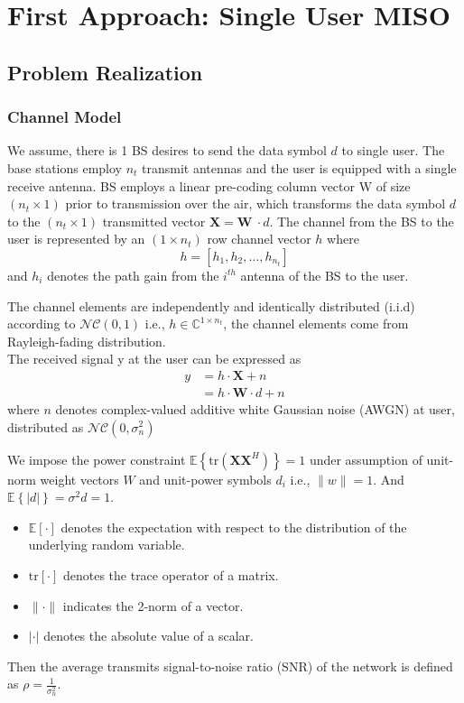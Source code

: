 \chapter{First Approach: Single User MISO}

\section{Problem Realization}

\subsection{Channel Model}
We assume, there is 1 BS desires to send the data symbol $d$ to single user. The base stations employ $n_t$ transmit antennas and the user is equipped with a single receive antenna. BS employs a linear pre-coding column vector W of size $(n_t \times 1)$ prior to transmission over the air, which transforms the data symbol $d$ to the $(n_t \times 1)$ transmitted vector $\mathbf{X}=\mathbf{W}\ \cdot d$.
The channel from the BS to the user is represented by an $(1 \times n_t)$ row channel vector $h$ where \[ h = [h_1, h_2, \ldots, h_{n_t}] \] and $h_i$ denotes the path gain from the $i^{th}$ antenna of the BS to the user.

The channel elements are independently and identically distributed (i.i.d) according to $\mathcal{N}\mathcal{C}(0,1)$ i.e.,
$h \in {\mathbb{C}}^{1 \times n_t}$, the channel elements come from Rayleigh-fading distribution. \\
The received signal y at the user can be expressed as
\begin{equation}
    \label{eq:channel model}
    \begin{aligned}
        y &= h \cdot \mathbf{X} + n \\
        &= h \cdot \mathbf{W} \cdot d + n
    \end{aligned}
\end{equation}
where $n$ denotes complex-valued additive white Gaussian noise (AWGN) at user, distributed as $\mathcal{N}\mathcal{C}(0,\sigma^2_n)$

We impose the power constraint $\mathbb{E} \left\{ \text{tr}\left( \mathbf{X} \mathbf{X}^H \right)\right\}=1$ under assumption of unit-norm weight vectors $W$ and unit-power symbols $d_i$ i.e., $\|w\| = 1$.
And $\mathbb{E}\left\{ |d| \right\} = \sigma^2 d = 1$.
\begin{itemize}
    \item $\mathbb{E}[\cdot]$ denotes the expectation with respect to the distribution of the underlying random variable.
    \item $\text{tr}[\cdot]$ denotes the trace operator of a matrix.
    \item $\|\cdot\|$ indicates the 2-norm of a vector.
    \item $|\cdot|$ denotes the absolute value of a scalar.
\end{itemize}
Then the average transmits signal-to-noise ratio (SNR) of the network is defined as $\rho = \frac{1}{\sigma^2_n}$.

